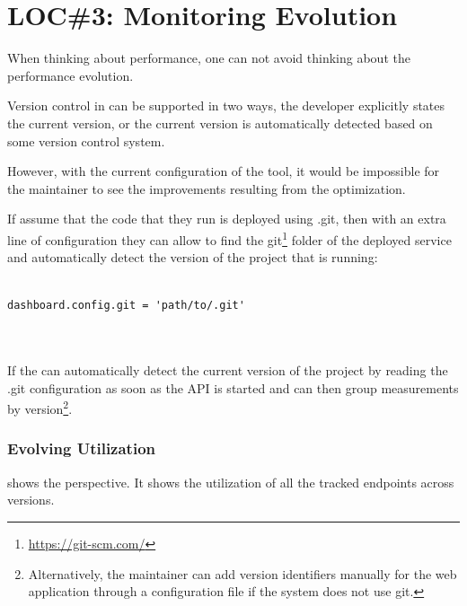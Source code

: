 


  
  \section{LOC\#3: Monitoring Evolution}
  

  When thinking about performance, 
  one can not avoid thinking about the performance evolution. 

  Version control in \tool can be supported in two ways,
  the developer explicitly states the current version, 
  or the current version is automatically detected based
  on some version control system. 


  However, with the current configuration of the tool, it would be impossible for the maintainer to see the improvements resulting from the optimization. 

  If assume that the code that they run is deployed using .git, then with an extra line of configuration they can allow \tool to find the git\footnote{\url{https://git-scm.com/}} folder of the deployed service and automatically detect the version of the project that is running: 
    
\begin{lstlisting}[style=custompython]

dashboard.config.git = 'path/to/.git'
  
      
\end{lstlisting}  
 
  If the \tool can automatically detect the current version of the project by reading the .git configuration as soon as the API is started and can then group measurements by version\footnote{Alternatively, the maintainer can add version identifiers manually for the web application through a configuration file if the system does not use git.}. 


  

  \subsubsection*{Evolving Utilization}

   shows the  perspective. 
  It shows the utilization of all the tracked endpoints across versions.

